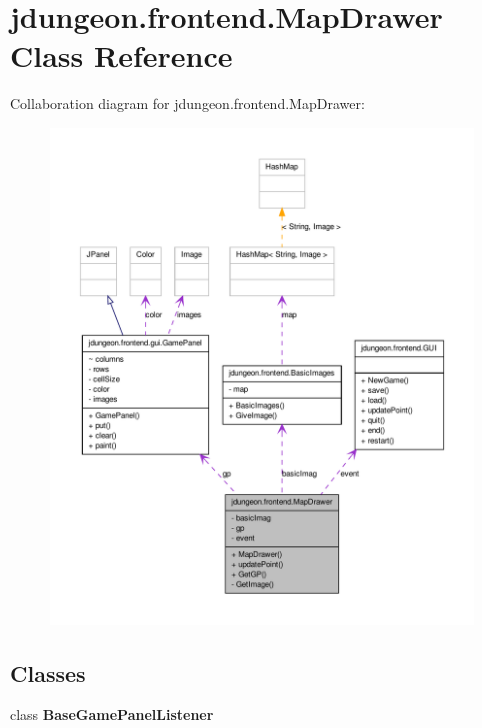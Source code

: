\hypertarget{classjdungeon_1_1frontend_1_1_map_drawer}{
\section{jdungeon.frontend.MapDrawer Class Reference}
\label{classjdungeon_1_1frontend_1_1_map_drawer}
}


Collaboration diagram for jdungeon.frontend.MapDrawer:
\nopagebreak
\begin{figure}[H]
\begin{center}
\leavevmode
\includegraphics[width=400pt]{classjdungeon_1_1frontend_1_1_map_drawer__coll__graph}
\end{center}
\end{figure}
\subsection*{Classes}
\begin{DoxyCompactItemize}
\item 
class {\bfseries BaseGamePanelListener}
\end{DoxyCompactItemize}
